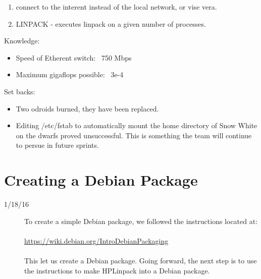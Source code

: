 \begin{description}
\begin{itemize}
\begin{enumerate}
        	\item connect to the interent instead of the local network, or vise vera.
      	\item LINPACK - executes linpack on a given number of processes. 
      \end{enumerate}
\end{itemize}
Knowledge:
\begin{itemize}
	\item Speed of Etherent switch: ~750 Mbps
	\item Maximum gigaflops possible: ~3e-4
\end{itemize}
Set backs:
\begin{itemize}
	\item Two odroids burned, they have been replaced.
	\item Editing /etc/fstab to automatically mount the home directory of Snow White
    on the dwarfs proved unsuccessful. This is something the team will continue
    to persue in future sprints.
\end{itemize}
\end{description}

\section{Creating a Debian Package}
\begin{description}
\item [1/18/16] To create a simple Debian package, we followed the instructions located at:\\ \\
\url{https://wiki.debian.org/IntroDebianPackaging}\\ \\
This let us create a Debian package. Going forward, the next step is to use the instructions to make HPLinpack into a Debian package.
\end{description}

